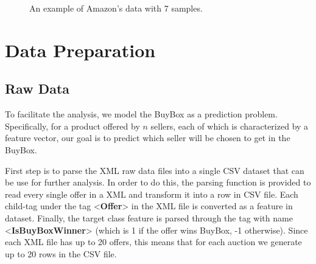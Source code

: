 \begin{figure}[!h]
	\begin{center}
	\end{center}
	\caption{\label{fig:exampleCSV}An example of Amazon's data with 7 samples.}
\end{figure}

\section{Data Preparation}
\label{sec:dataprepare}

\subsection{Raw Data}
\label{sec:datacsv}
To facilitate the analysis, we model the BuyBox as a prediction problem. Specifically, for a product offered by $n$ sellers, each of which is characterized by 
a feature vector, our goal is to predict which seller will be chosen to get in the BuyBox. 

First step is to parse the XML raw data files into a single CSV dataset that can be use for further analysis. 
In order to do this, the parsing function is provided to read every single offer in a XML and transform it into a row in CSV file. Each child-tag under the tag <{\textbf{Offer}}> in the XML file 
is converted as a feature in dataset. Finally, the target class feature is parsed through the tag with name <\textbf{IsBuyBoxWinner}> (which is 1 if the offer wins BuyBox, -1 otherwise). 
Since each XML file has up to 20 offers, this means that for each auction we generate up to 20 rows in the CSV file.

